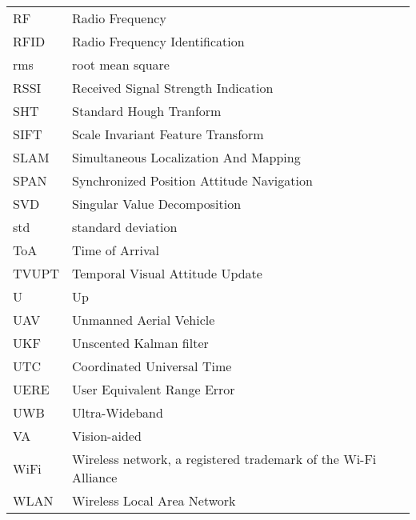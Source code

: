\begin{tabular}{l@{\hspace{2cm}}l}
\setlength{\tabcolsep}{50mm}
RF & Radio Frequency\\[2.0ex]
RFID & Radio Frequency Identification\\[2.0ex]
rms & root mean square\\[2.0ex]
RSSI & Received Signal Strength Indication\\[2.0ex]
SHT & Standard Hough Tranform\\[2.0ex]
SIFT & Scale Invariant Feature Transform\\[2.0ex]
SLAM & Simultaneous Localization And Mapping\\[2.0ex]
SPAN & Synchronized Position Attitude Navigation\\[2.0ex]
SVD & Singular Value Decomposition\\[2.0ex]
std & standard deviation\\[2.0ex]
ToA & Time of Arrival\\[2.0ex]
TVUPT & Temporal Visual Attitude Update\\[2.0ex]
U & Up\\[2.0ex]
UAV & Unmanned Aerial Vehicle\\[2.0ex]
UKF & Unscented Kalman filter\\[2.0ex]
UTC & Coordinated Universal Time\\[2.0ex]
UERE & User Equivalent Range Error\\[2.0ex]
UWB & Ultra-Wideband\\[2.0ex]
VA & Vision-aided\\[2.0ex]
WiFi & Wireless network, a registered trademark of the Wi-Fi Alliance\\[2.0ex]
WLAN & Wireless Local Area Network\\[2.0ex]
\end{tabular}

